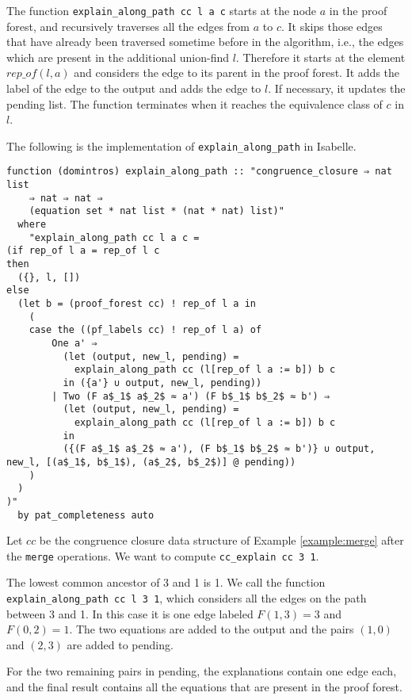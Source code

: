 The function \lstinline{explain_along_path cc l a c} starts at the node $a$ in the proof forest, and recursively traverses all the edges from $a$ to $c$. It skips those edges that have already been traversed sometime before in the algorithm, i.e., the edges which are present in the additional union-find $l$. Therefore it starts at the element $rep\_of(l, a)$ and considers the edge to its parent in the proof forest. It adds the label of the edge to the output and adds the edge to $l$. If necessary, it updates the pending list. The function terminates when it reaches the equivalence class of $c$ in $l$.

The following is the implementation of \lstinline|explain_along_path| in Isabelle.

\clearpage

\begin{lstlisting}
function (domintros) explain_along_path :: "congruence_closure ⇒ nat list
    ⇒ nat ⇒ nat ⇒
    (equation set * nat list * (nat * nat) list)"
  where
    "explain_along_path cc l a c =
(if rep_of l a = rep_of l c
then
  ({}, l, [])
else
  (let b = (proof_forest cc) ! rep_of l a in
    (
    case the ((pf_labels cc) ! rep_of l a) of
        One a' ⇒
          (let (output, new_l, pending) =
            explain_along_path cc (l[rep_of l a := b]) b c
          in ({a'} ∪ output, new_l, pending))
        | Two (F a$_1$ a$_2$ ≈ a') (F b$_1$ b$_2$ ≈ b') ⇒
          (let (output, new_l, pending) =
            explain_along_path cc (l[rep_of l a := b]) b c
          in
          ({(F a$_1$ a$_2$ ≈ a'), (F b$_1$ b$_2$ ≈ b')} ∪ output, new_l, [(a$_1$, b$_1$), (a$_2$, b$_2$)] @ pending))
    )
  )
)"
  by pat_completeness auto
\end{lstlisting}

\begin{exmp}
Let $cc$ be the congruence closure data structure of Example \ref{example:merge} after the \lstinline|merge| operations. We want to compute \lstinline|cc_explain cc 3 1|.

The lowest common ancestor of 3 and 1 is 1. We call the function \lstinline{explain_along_path cc l 3 1}, which considers all the edges on the path between 3 and 1. In this case it is one edge labeled $F (1,3) = 3$ and $F(0,2) = 1$. The two equations are added to the output and the pairs $(1,0)$ and $(2,3)$ are added to pending.

For the two remaining pairs in pending, the explanations contain one edge each, and the final result contains all the equations that are present in the proof forest.
\end{exmp}


